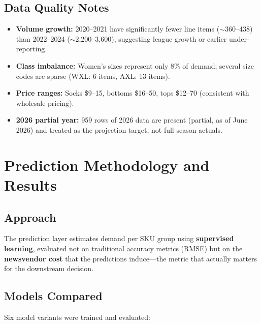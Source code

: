 \documentclass[11pt, letterpaper]{article}
\begin{document}
\subsection{Data Quality Notes}

\begin{itemize}[nosep]
    \item \textbf{Volume growth:} 2020--2021 have significantly fewer line items ($\sim$360--438) than 2022--2024 ($\sim$2,200--3,600), suggesting league growth or earlier under-reporting.
    \item \textbf{Class imbalance:} Women's sizes represent only 8\% of demand; several size codes are sparse (WXL: 6 items, AXL: 13 items).
    \item \textbf{Price ranges:} Socks \$9--15, bottoms \$16--50, tops \$12--70 (consistent with wholesale pricing).
    \item \textbf{2026 partial year:} 959 rows of 2026 data are present (partial, as of June 2026) and treated as the projection target, not full-season actuals.
\end{itemize}

\section{Prediction Methodology and Results}

\subsection{Approach}

The prediction layer estimates demand per SKU group using \textbf{supervised learning}, evaluated not on traditional accuracy metrics (RMSE) but on the \textbf{newsvendor cost} that the predictions induce---the metric that actually matters for the downstream decision.

\subsection{Models Compared}

Six model variants were trained and evaluated:
\end{document}
